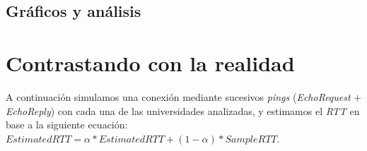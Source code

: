 \documentclass[final,inline,a4paper,narroweqnarray]{ieee}
\let\Oldsection\section
\renewcommand{\section}{\FloatBarrier\Oldsection}
\let\Oldsubsection\subsection
\renewcommand{\subsection}{\FloatBarrier\Oldsubsection}
\begin{document}
\subsection{Gráficos y análisis}

\section{Contrastando con la realidad}
A continuación simulamos una conexión mediante sucesivos \emph{pings} (\emph{EchoRequest} $+$ \emph{EchoReply}) con cada una de las universidades analizadas, y estimamos el \emph{RTT} en base a la siguiente ecuación: $ EstimatedRTT = \alpha * EstimatedRTT + (1 - \alpha) * SampleRTT $. 
\end{document}
